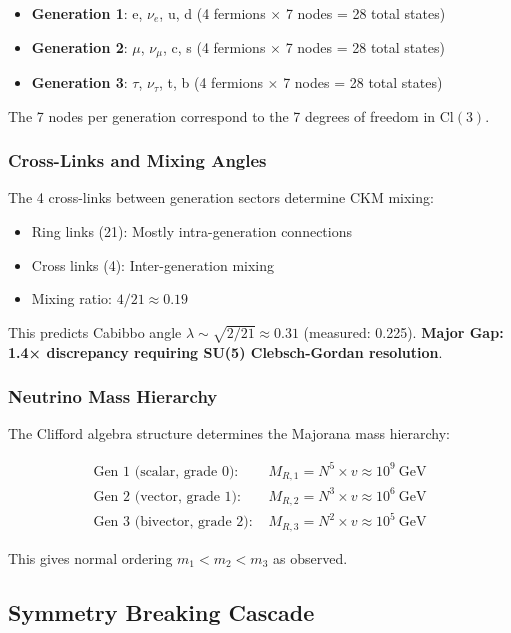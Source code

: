 \documentclass[12pt,a4paper]{article}
\begin{document}
\begin{itemize}
\item \textbf{Generation 1}: e, $\nu_e$, u, d (4 fermions $\times$ 7 nodes = 28 total states)
\item \textbf{Generation 2}: $\mu$, $\nu_\mu$, c, s (4 fermions $\times$ 7 nodes = 28 total states)
\item \textbf{Generation 3}: $\tau$, $\nu_\tau$, t, b (4 fermions $\times$ 7 nodes = 28 total states)
\end{itemize}

The 7 nodes per generation correspond to the 7 degrees of freedom in $\mathrm{Cl}(3)$.

\subsubsection{Cross-Links and Mixing Angles}
The 4 cross-links between generation sectors determine CKM mixing:

\begin{itemize}
\item Ring links (21): Mostly intra-generation connections
\item Cross links (4): Inter-generation mixing
\item Mixing ratio: $4/21 \approx 0.19$
\end{itemize}

This predicts Cabibbo angle $\lambda \sim \sqrt{2/21} \approx 0.31$ (measured: 0.225). \textbf{Major Gap: 1.4× discrepancy requiring SU(5) Clebsch-Gordan resolution}.

\subsubsection{Neutrino Mass Hierarchy}
The Clifford algebra structure determines the Majorana mass hierarchy:

\begin{align}
\text{Gen 1 (scalar, grade 0): } &M_{R,1} = N^5 \times v \approx 10^9\ \text{GeV} \\
\text{Gen 2 (vector, grade 1): } &M_{R,2} = N^3 \times v \approx 10^6\ \text{GeV} \\
\text{Gen 3 (bivector, grade 2): } &M_{R,3} = N^2 \times v \approx 10^5\ \text{GeV}
\end{align}

This gives normal ordering $m_1 < m_2 < m_3$ as observed.

\subsection{Symmetry Breaking Cascade}
\end{document}
